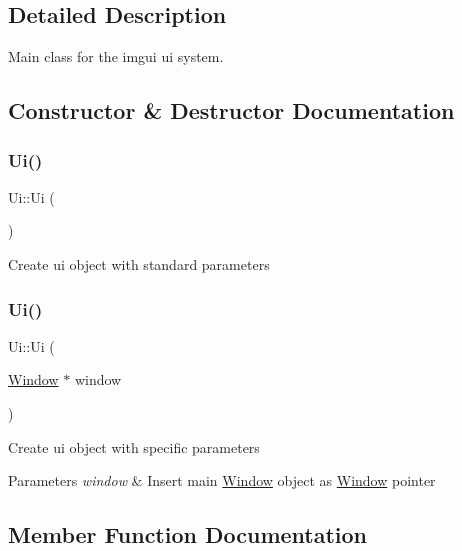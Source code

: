 \subsection{Detailed Description}
Main class for the imgui ui system. 

\subsection{Constructor \& Destructor Documentation}
\mbox{\label{class_ui_a6e07807d24fb5874a7e51d7ff0196236}} 
\subsubsection{\texorpdfstring{Ui()}{Ui()}\hspace{0.1cm}{\footnotesize\ttfamily [1/2]}}
{\footnotesize\ttfamily Ui\+::\+Ui (\begin{DoxyParamCaption}{ }\end{DoxyParamCaption})}

Create ui object with standard parameters \mbox{\label{class_ui_a1f38d058c05e95d93d56a0018b246f5a}} 
\subsubsection{\texorpdfstring{Ui()}{Ui()}\hspace{0.1cm}{\footnotesize\ttfamily [2/2]}}
{\footnotesize\ttfamily Ui\+::\+Ui (\begin{DoxyParamCaption}\item[{\mbox{\hyperlink{class_window}{Window}} $\ast$}]{window }\end{DoxyParamCaption})}

Create ui object with specific parameters 
\begin{DoxyParams}{Parameters}
{\em window} & Insert main \mbox{\hyperlink{class_window}{Window}} object as \mbox{\hyperlink{class_window}{Window}} pointer \\
\hline
\end{DoxyParams}


\subsection{Member Function Documentation}
\mbox{\label{class_ui_a8c3bedaa0b52c63529cbbb460f322894}} 

